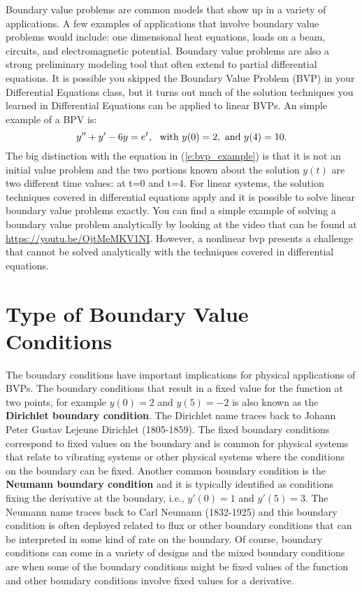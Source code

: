 \documentclass[twoside]{article}
\begin{document}
Boundary value problems are common models that show up in a variety of applications. A few examples of applications that involve boundary value problems would include: one dimensional heat equations, loads on a beam, circuits, and electromagnetic potential. Boundary value problems are also a strong preliminary modeling tool that often extend to partial differential equations. It is possible you skipped the Boundary Value Problem (BVP) in your Differential Equations class, but it turns out much of the solution techniques you learned in Differential Equations can be applied to linear BVPs. An simple example of a BPV is:
\begin{equation}
y'' + y' - 6y = e^{t}, \ \ {\rm with} \ y(0) = 2, \ {\rm and} \ y(4)=10.
    \label{e:bvp_example}
\end{equation}
The big distinction with the equation in (\ref{e:bvp_example}) is that it is not an initial value problem and the two portions known about the solution $y(t)$ are two different time values: at t=0 and t=4. For linear systems, the solution techniques covered in differential equations apply and it is possible to solve linear boundary value problems exactly. You can find a simple example of solving a boundary value problem analytically by looking at the video that can be found at \href{https://youtu.be/OjtMeMKV1NI}{https://youtu.be/OjtMeMKV1NI}.  However, a nonlinear bvp presents a challenge that cannot be solved analytically with the techniques covered in differential equations.  

\section{Type of Boundary Value Conditions}
The boundary conditions have important implications for physical applications of BVPs. The boundary conditions that result in a fixed value for the function at two points, for example $y(0)=2$ and $y(5)=-2$ is also known as the {\bf Dirichlet boundary condition}. The Dirichlet name traces back to Johann Peter Gustav Lejeune Dirichlet (1805-1859). The fixed boundary conditions correspond to fixed values on the boundary and is common for physical systems that relate to vibrating systems or other physical systems where the conditions on the boundary can be fixed. Another common boundary condition is the {\bf Neumann boundary condition} and it is typically identified as conditions fixing the derivative at the boundary, i.e., $y'(0) = 1$ and $y'(5) = 3$. The Neumann name traces back to Carl Neumann (1832-1925) and this boundary condition is often deployed related to flux or other boundary conditions that can be interpreted in some kind of rate on the boundary. Of course, boundary conditions can come in a variety of designs and the mixed boundary conditions are when some of the boundary conditions might be fixed values of the function and other boundary conditions involve fixed values for a derivative. 
\end{document}
